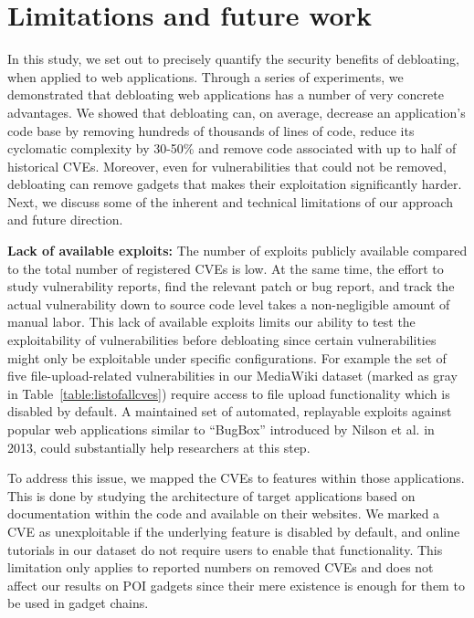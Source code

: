 \section{Limitations and future work}
\label{sec:limitations}
In this study, we set out to precisely quantify the security benefits of
debloating, when applied to web applications. Through a series of experiments,
we demonstrated that debloating web applications has a number of very
concrete advantages. We showed that debloating can, on average, decrease an
application's code base by removing hundreds of thousands of lines of code,
reduce its cyclomatic complexity by 30-50\% and remove code associated with
up to half of historical CVEs. Moreover, even for vulnerabilities that could
not be removed, debloating can remove gadgets that makes their exploitation
significantly harder. Next, we discuss some of the inherent and technical limitations of our approach and future direction.

\vspace{1ex}

\noindent\textbf{Lack of available exploits:} The number of exploits publicly available compared to the total number of registered CVEs is low. At the same time, the effort to study vulnerability reports, find the relevant patch or bug report, and track the actual vulnerability down to source code level takes a non-negligible amount of manual labor.
This lack of available exploits limits our ability to test the exploitability of vulnerabilities before debloating since certain vulnerabilities might only be exploitable under specific configurations.
For example the set of five file-upload-related vulnerabilities in our MediaWiki dataset (marked as gray in Table~\ref{table:listofallcves}) require access to file upload functionality which is disabled by default. A maintained set of automated, replayable exploits against popular web applications similar to ``BugBox'' introduced by Nilson et al. in 2013, could substantially help researchers at this step\cite{bugbox}.

To address this issue, we mapped the CVEs to features within those applications. This is done by studying the architecture of
target applications based on documentation within the code and available on their websites. We marked a CVE as unexploitable if the underlying feature is disabled by default, and online tutorials in our dataset do not
require users to enable that functionality. This limitation only applies to reported numbers on removed CVEs and does not affect our results on POI gadgets since their mere existence is enough for them to be used in gadget chains.

